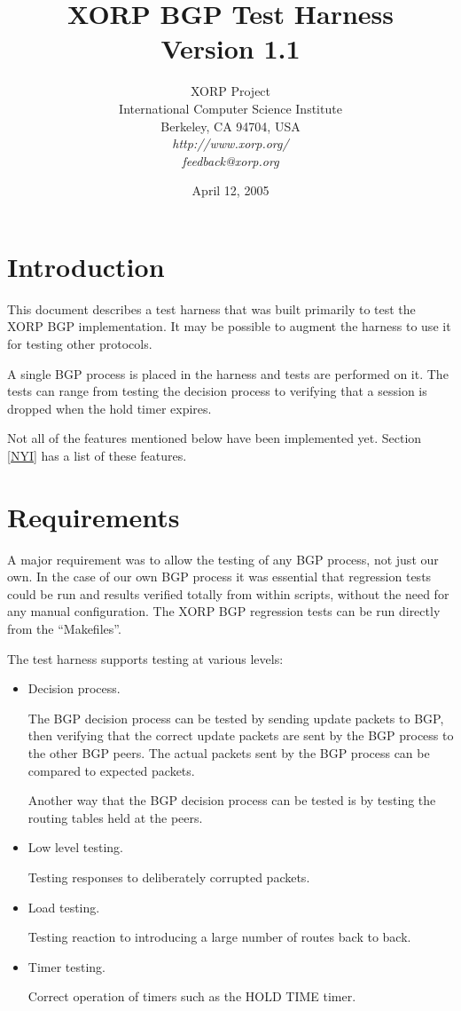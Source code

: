 \documentclass[11pt]{article}
\title{XORP BGP Test Harness \\
\vspace{1ex}
Version 1.1}
\author{ XORP Project                                   \\
         International Computer Science Institute       \\
         Berkeley, CA 94704, USA                        \\
         {\it http://www.xorp.org/}			\\
         {\it feedback@xorp.org}
}
\date{April 12, 2005}
\begin{document}
\maketitle

\section{Introduction}

This document describes a test harness that was built primarily to
test the XORP BGP implementation. It may be possible to augment the
harness to use it for testing other protocols.

A single BGP process is placed in the harness and tests
are performed on it. The tests can range from testing the decision
process to verifying that a session is dropped when the hold timer expires.

Not all of the features mentioned below have been implemented yet.
Section \ref{NYI} has a list of these features.

\section{Requirements}

A major requirement was to allow the testing of any BGP process, not
just our own. In the case of our own BGP process it was essential that
regression tests could be run and results verified totally from within
scripts, without the need for any manual configuration. The
XORP BGP regression tests can be run directly from the ``Makefiles''.
\newline

The test harness supports testing at various levels:

\begin{itemize}
\item Decision process.

  The BGP decision process can be tested by sending update packets to
  BGP, then verifying that the correct update packets are sent by the
  BGP process to the other BGP peers. The actual packets sent by the
  BGP process can be compared to expected packets. 

  Another way that the BGP decision process can be tested is by
  testing the routing tables held at the peers.

\item Low level testing.

 Testing responses to deliberately corrupted packets.

\item Load testing. 

  Testing reaction to introducing a large number of routes back
  to back.

\item Timer testing.

  Correct operation of timers such as the HOLD TIME timer.

\end{itemize}
\end{document}
